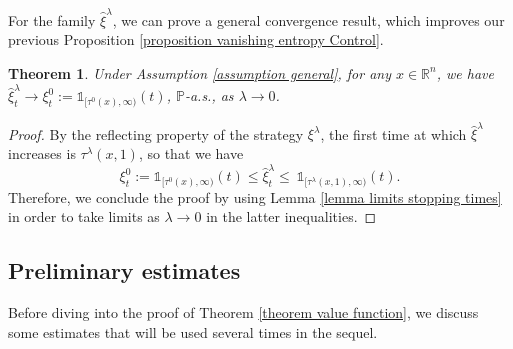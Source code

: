 \documentclass[11pt]{amsart}
\newcommand{\jo}[1]{{\textcolor{blue}{#1}}}
\newtheorem{theorem}{Theorem}[section]
\theoremstyle{plain}
\def \R{\mathbb{R}}
\def \P{\mathbb{P}}
\numberwithin{equation}{section}
\begin{document}
For the family $\hat \xi ^\lambda$, we can prove a general convergence result, which improves our previous Proposition \ref{proposition vanishing entropy Control}.
\begin{theorem}
    \label{theorem convergence of modified strategies}
    Under Assumption \ref{assumption general}, for any $x \in \R ^n$, we have $\hat \xi^\lambda_t  \to \xi ^0_t := \mathds 1 _{[\tau ^0(x), \infty)} (t) $, $\P$-a.s., as $\lambda \to 0$.
\end{theorem}
\begin{proof}
    By the reflecting property of the strategy $\xi^\lambda$, the first time at which $\hat \xi ^\lambda$ increases is $\tau ^\lambda (x,1)$, so that we have
    $$
   \xi ^0_t := \mathds 1 _{[\tau ^0(x), \infty)} (t)  \leq \hat \xi^\lambda_t \leq \ \mathds 1 _{[\tau ^\lambda(x,1), \infty)} (t). 
    $$
    Therefore, we conclude the proof by using Lemma \ref{lemma limits stopping times} in order to take limits as $\lambda \to 0$ in the latter inequalities.
\end{proof}

\subsection{Preliminary estimates}
Before diving into the proof of Theorem \ref{theorem value function}, we discuss some estimates that will be used several times in the sequel.
\end{document}
